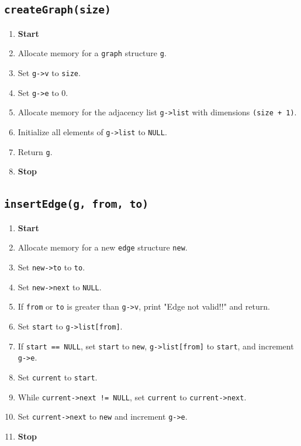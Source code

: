 {  \subsection{\texttt{createGraph(size)}}
  \begin{enumerate}[label=\arabic*:,left=0pt]
    \item \textbf{Start}
    \item Allocate memory for a \texttt{graph} structure \texttt{g}.
    \item Set \texttt{g->v} to \texttt{size}.
    \item Set \texttt{g->e} to 0.
    \item Allocate memory for the adjacency list \texttt{g->list} with dimensions \texttt{(size + 1)}.
    \item Initialize all elements of \texttt{g->list} to \texttt{NULL}.
    \item Return \texttt{g}.
    \item \textbf{Stop}
  \end{enumerate}

  \subsection{\texttt{insertEdge(g, from, to)}}
  \begin{enumerate}[label=\arabic*:,left=0pt]
    \item \textbf{Start}
    \item Allocate memory for a new \texttt{edge} structure \texttt{new}.
    \item Set \texttt{new->to} to \texttt{to}.
    \item Set \texttt{new->next} to \texttt{NULL}.
    \item If \texttt{from} or \texttt{to} is greater than \texttt{g->v}, print "Edge not valid!!" and return.
    \item Set \texttt{start} to \texttt{g->list[from]}.
    \item If \texttt{start == NULL}, set \texttt{start} to \texttt{new}, \texttt{g->list[from]} to \texttt{start}, and increment \texttt{g->e}.
    \item Set \texttt{current} to \texttt{start}.
    \item While \texttt{current->next != NULL}, set \texttt{current} to \texttt{current->next}.
    \item Set \texttt{current->next} to \texttt{new} and increment \texttt{g->e}.
    \item \textbf{Stop}
  \end{enumerate}

}
